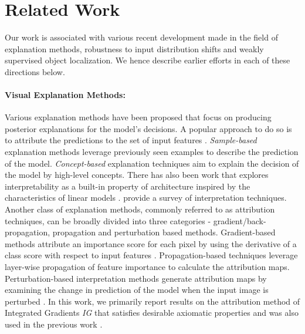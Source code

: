 \documentclass[runningheads]{llncs}
\begin{document}
\section{Related Work}\label{sec_related_work}
Our work is associated with various recent development made in the field of explanation methods, robustness to input distribution shifts and weakly supervised object localization. We hence describe earlier efforts in each of these directions below.

\paragraph{\textbf{Visual Explanation Methods:}}
Various explanation methods have been proposed that focus on producing posterior explanations for the model's decisions. A popular approach to do so is to attribute the predictions to the set of input features \cite{attr2013gradient,attr2015deconv,attr2016inputgradient,attr2017integrated,attr2017deeplift,attr2018LRP}. \textit{Sample-based} explanation methods \cite{sample_explain_1,sample_explain_2} leverage previously seen examples to describe the prediction of the model. \textit{Concept-based} explanation techniques \cite{feature_explain_1,feature_explain_2} aim to explain the decision of the model by high-level concepts. There has also been work that explores interpretability as a built-in property of architecture inspired by the characteristics of linear models \cite{self_explain_nips_2018}. \cite{survey_interpretation_1,survey_interpretation_2} provide a survey of interpretation techniques. Another class of explanation methods, commonly referred to as attribution techniques, can be broadly divided into three categories - gradient/back-propagation, propagation and perturbation based methods. Gradient-based methods attribute an importance score for each pixel by using the derivative of a class score with respect to input features \cite{attr2013gradient,attr2016inputgradient,attr2017integrated}. Propagation-based techniques \cite{attr2018LRP,attr2017deeplift,attr2018ebackprop} leverage layer-wise propagation of feature importance to calculate the attribution maps. Perturbation-based interpretation methods generate attribution maps by examining the change in prediction of the model when the input image is perturbed \cite{attr2016perturb_1,attr2018perturb_2,attr2016perturb_3_lime}. In this work, we primarily report results on the attribution method of Integrated Gradients \textit{IG} \cite{attr2017integrated} that satisfies desirable axiomatic properties and was also used in the previous work \cite{robust_attr_nips_sal}.
\end{document}
